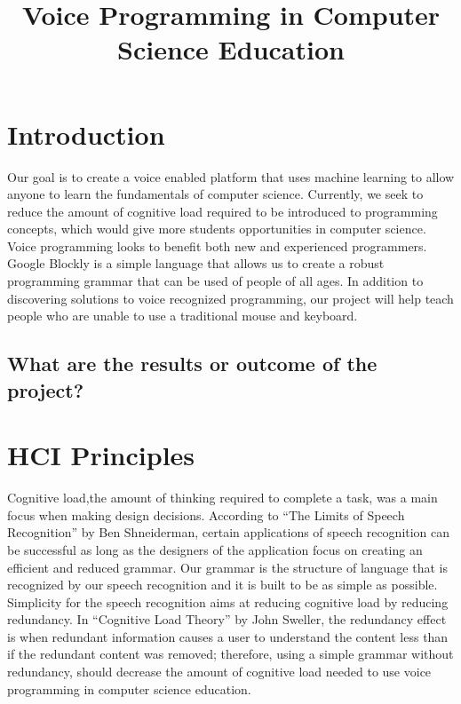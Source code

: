 \documentclass[]{article}
\title{Voice Programming in Computer Science Education}
\begin{document}
\maketitle

\section{Introduction}

Our goal is to create a voice enabled platform that uses machine learning to allow 
anyone to learn the fundamentals of computer science. Currently, we seek to reduce the amount
of cognitive load required to be introduced to programming concepts, which would give more 
students opportunities in computer science. 
\\ 
Voice programming looks to benefit both new and experienced programmers.  
Google Blockly is a simple language that allows us to create a robust programming grammar 
that can be used of people of all ages. In addition to discovering solutions to voice 
recognized programming, our project will help teach people who are unable to use a traditional mouse and keyboard.

\subsection{What are the results or outcome of the project?}

\section{HCI Principles}

Cognitive load,the amount of thinking required to complete a task, was a main focus when
making design decisions. According to ``The Limits of Speech Recognition'' by Ben Shneiderman, certain
applications of speech recognition can be successful as long as the designers of the application 
focus on creating an efficient and reduced grammar. Our grammar is the structure of language that is 
recognized by our speech recognition and it is built to be as simple as possible. Simplicity for the
speech recognition aims at reducing cognitive load by reducing redundancy. In “Cognitive Load Theory”
by John Sweller, the redundancy effect is when redundant information causes a user to understand the content
less than if the redundant content was removed; therefore, using a simple grammar without redundancy,
should decrease the amount of cognitive load needed to use voice programming in computer science education.
\end{document}
